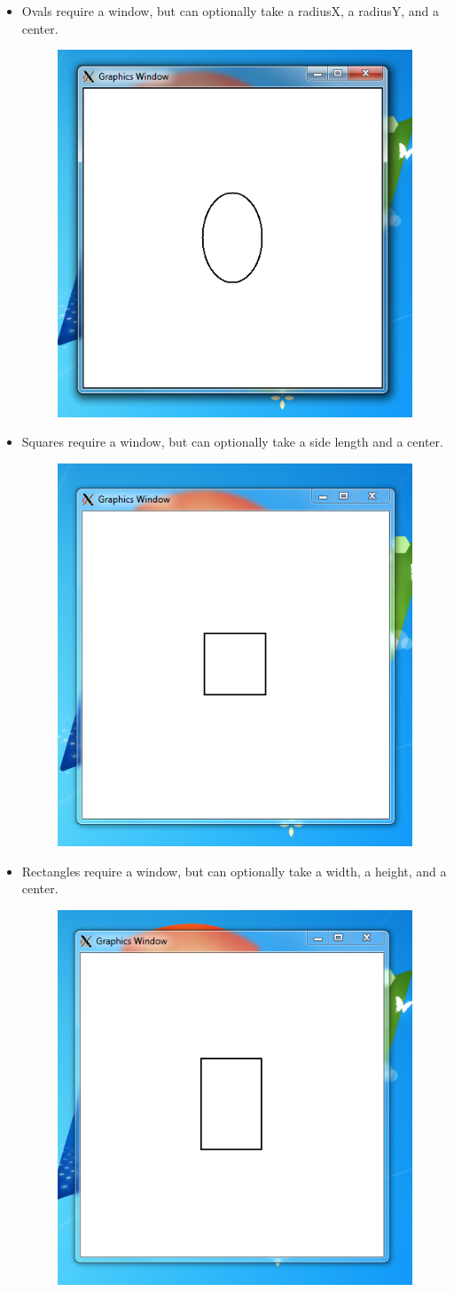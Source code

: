 \documentclass{article}
\begin{document}
\begin{itemize}
\item Ovals require a window, but can optionally take a radiusX, a radiusY, and a center. 
\begin{figure}[h!]
\centering
\includegraphics[width=.5\textwidth]{oval}
\end{figure}

\pagebreak

\item Squares require a window, but can optionally take a side length and a center. 
\begin{figure}[h!]
\centering
\includegraphics[width=.5\textwidth]{square}
\end{figure}

\item Rectangles require a window, but can optionally take a width, a height, and a center. 
\begin{figure}[h!]
\centering
\includegraphics[width=.5\textwidth]{rectangle}
\end{figure}


\end{itemize}
\end{document}
